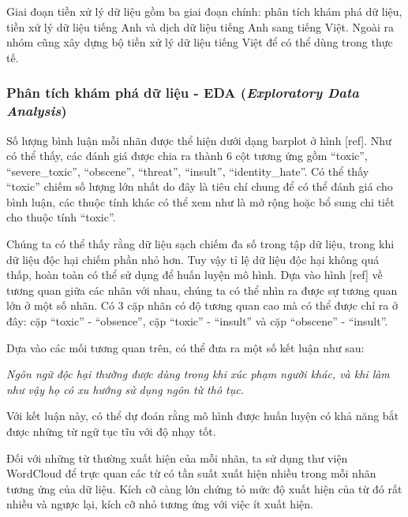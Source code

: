 Giai đoạn tiền xử lý dữ liệu gồm ba giai đoạn chính: phân tích khám phá dữ liệu, tiền xử lý dữ liệu tiếng Anh và dịch dữ liệu tiếng Anh sang tiếng Việt. Ngoài ra nhóm cũng xây dựng bộ tiền xử lý dữ liệu tiếng Việt để có thể dùng trong thực tế.

\subsubsection{Phân tích khám phá dữ liệu - EDA (\textit{Exploratory Data Analysis})}
Số lượng bình luận mỗi nhãn được thể hiện dưới dạng barplot ở hình [ref]. Như có thể thấy, các đánh giá được chia ra thành 6 cột tương ứng gồm ``toxic'', ``severe\_toxic'', ``obscene'', ``threat'', ``insult'', ``identity\_hate''. Có thể thấy ``toxic'' chiếm số lượng lớn nhất do đây là tiêu chí chung để có thể đánh giá cho bình luận, các thuộc tính khác có thể xem như là mở rộng hoặc bổ sung chi tiết cho thuộc tính ``toxic''.

Chúng ta có thể thấy rằng dữ liệu sạch chiếm đa số trong tập dữ liệu, trong khi dữ liệu độc hại chiếm phần nhỏ hơn. Tuy vậy tỉ lệ dữ liệu độc hại không quá thấp, hoàn toàn có thể sử dụng để huấn luyện mô hình. Dựa vào hình [ref] về tương quan giữa các nhãn với nhau, chúng ta có thể nhìn ra được sự tương quan lớn ở một số nhãn. Có 3 cặp nhãn có độ tương quan cao mà có thể được chỉ ra ở đây: cặp ``toxic'' - ``obsence'', cặp ``toxic'' - ``insult'' và cặp ``obscene'' - ``insult''.

Dựa vào các mối tương quan trên, có thể đưa ra một số kết luận như sau:

\textit{Ngôn ngữ độc hại thường được dùng trong khi xúc phạm người khác, và khi làm như vậy họ có xu hướng sử dụng ngôn từ thô tục.}

Với kết luận này, có thể dự đoán rằng mô hình được huấn luyện có khả năng bắt được những từ ngữ tục tĩu với độ nhạy tốt.

Đối với những từ thường xuất hiện của mỗi nhãn, ta sử dụng thư viện WordCloud để trực quan các từ có tần suất xuất hiện nhiều trong mỗi nhãn tương ứng của dữ liệu. Kích cỡ càng lớn chứng tỏ mức độ xuất hiện của từ đó rất nhiều và ngược lại, kích cỡ nhỏ tương ứng với việc ít xuất hiện.

